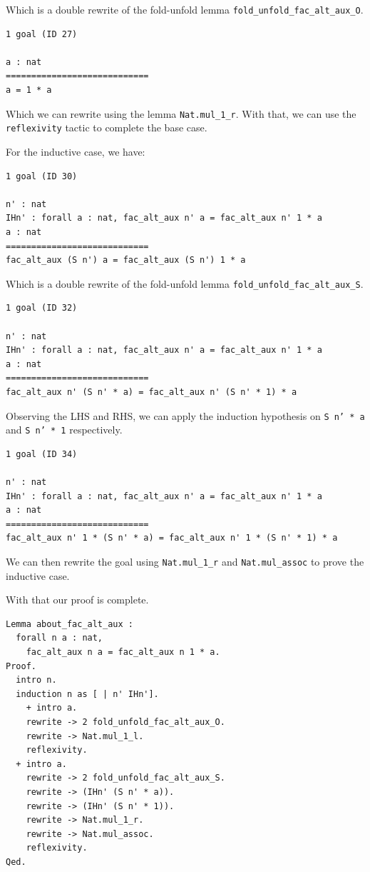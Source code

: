 \documentclass{article}
\begin{document}
Which is a double rewrite of the fold-unfold lemma \texttt{fold\_unfold\_fac\_alt\_aux\_O}. 

\begin{lstlisting}
1 goal (ID 27)

a : nat
============================
a = 1 * a
\end{lstlisting}

Which we can rewrite using the lemma \texttt{Nat.mul\_1\_r}. With that, we can use the \texttt{reflexivity} tactic to complete the base case.

For the inductive case, we have:

\begin{lstlisting}
1 goal (ID 30)

n' : nat
IHn' : forall a : nat, fac_alt_aux n' a = fac_alt_aux n' 1 * a
a : nat
============================
fac_alt_aux (S n') a = fac_alt_aux (S n') 1 * a
\end{lstlisting}

Which is a double rewrite of the fold-unfold lemma \texttt{fold\_unfold\_fac\_alt\_aux\_S}.

\begin{lstlisting}
1 goal (ID 32)

n' : nat
IHn' : forall a : nat, fac_alt_aux n' a = fac_alt_aux n' 1 * a
a : nat
============================
fac_alt_aux n' (S n' * a) = fac_alt_aux n' (S n' * 1) * a
\end{lstlisting}

Observing the LHS and RHS, we can apply the induction hypothesis on \texttt{S n' * a} and \texttt{S n' * 1} respectively.

\begin{lstlisting}
1 goal (ID 34)

n' : nat
IHn' : forall a : nat, fac_alt_aux n' a = fac_alt_aux n' 1 * a
a : nat
============================
fac_alt_aux n' 1 * (S n' * a) = fac_alt_aux n' 1 * (S n' * 1) * a
\end{lstlisting}

We can then rewrite the goal using \texttt{Nat.mul\_1\_r} and \texttt{Nat.mul\_assoc} to prove the inductive case.

With that our proof is complete.

\begin{lstlisting}
Lemma about_fac_alt_aux :
  forall n a : nat,
    fac_alt_aux n a = fac_alt_aux n 1 * a.
Proof.
  intro n.
  induction n as [ | n' IHn'].
    + intro a.
    rewrite -> 2 fold_unfold_fac_alt_aux_O.
    rewrite -> Nat.mul_1_l.
    reflexivity.
  + intro a.
    rewrite -> 2 fold_unfold_fac_alt_aux_S.
    rewrite -> (IHn' (S n' * a)).
    rewrite -> (IHn' (S n' * 1)).
    rewrite -> Nat.mul_1_r.
    rewrite -> Nat.mul_assoc.
    reflexivity.
Qed.
\end{lstlisting}
\end{document}
